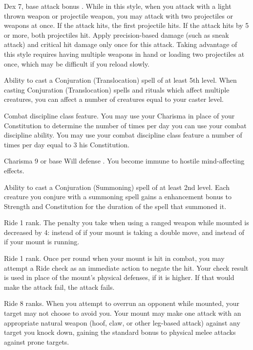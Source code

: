  Dex 7, base attack bonus .
 While in this style, when you attack with a light thrown weapon or projectile weapon, you may attack with two projectiles or weapons at once. If the attack hits, the first projectile hits. If the attack hits by 5 or more, both projectiles hit. Apply precision-based damage (such as sneak attack) and critical hit damage only once for this attack. Taking advantage of this style requires having multiple weapons in hand or loading two projectiles at once, which may be difficult if you reload slowly.

\featpre Ability to cast a Conjuration (Translocation) spell of at least 5th level.
\featben When casting Conjuration (Translocation) spells and rituals which affect multiple creatures, you can affect a number of creatures equal to your caster level.

\featpre Combat discipline class feature.
\featben You may use your Charisma in place of your Constitution to determine the number of times per day you can use your combat discipline ability.
 You may use your combat discipline class feature a number of times per day equal to 3 \add his Constitution.

\featpre Charisma 9 or base Will defense .
\featben You become immune to hostile mind-affecting effects.

 Ability to cast a Conjuration (Summoning) spell of at least 2nd level.
 Each creature you conjure with a summoning spell gains a  enhancement bonus to Strength and Constitution for the duration of the spell that summoned it.

\featpre Ride 1 rank.
 The penalty you take when using a ranged weapon while mounted is decreased by 4:  instead of  if your mount is taking a double move, and  instead of  if your mount is running.

 Ride 1 rank.
 Once per round when your mount is hit in combat, you may attempt a Ride check as an immediate action to negate the hit. Your check result is used in place of the mount's physical defenses, if it is higher. If that would make the attack fail, the attack fails.

 Ride 8 ranks.
 When you attempt to overrun an opponent while mounted, your target may not choose to avoid you. Your mount may make one attack with an appropriate natural weapon (hoof, claw, or other leg-based attack) against any target you knock down, gaining the standard  bonus to physical melee attacks against prone targets.

